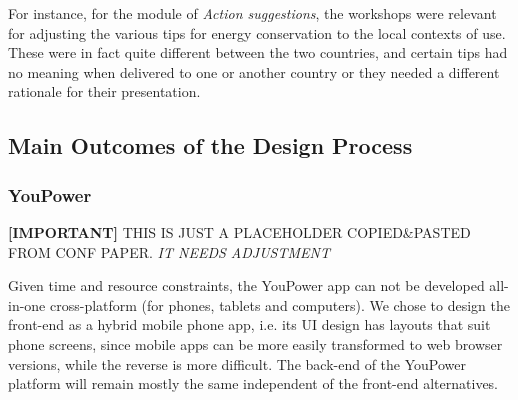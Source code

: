 For instance, for the module of \textit{Action suggestions}, the workshops were relevant for adjusting the various
tips for energy conservation to the local contexts of use. These were in fact quite different between the two countries,
 and certain tips had no meaning when delivered to one or another country or they needed a different
 rationale for their presentation.


\subsection{Main Outcomes of the Design Process} %

\subsubsection{YouPower} %
\begin{svgraybox}
\textbf{[IMPORTANT]} THIS IS JUST A PLACEHOLDER COPIED\&PASTED FROM CONF PAPER. \textit{IT NEEDS ADJUSTMENT}
\end{svgraybox}

\noindent Given time and resource constraints, the YouPower app can not be developed all-in-one cross-platform (for phones, tablets and computers). We chose to design the front-end as a hybrid mobile phone app, i.e. its UI design has layouts that suit phone screens, %
since mobile apps can be more easily transformed to web browser versions, while the reverse is more difficult.
The back-end of the YouPower platform will remain mostly the same independent of the front-end alternatives.

